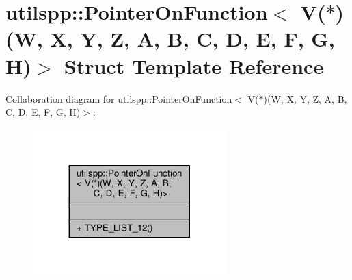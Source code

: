 \hypertarget{structutilspp_1_1PointerOnFunction_3_01V_07_5_08_07W_00_01X_00_01Y_00_01Z_00_01A_00_01B_00_01C_0aa55322b0a01a25603f55328f88cca8b}{\section{utilspp\-:\-:Pointer\-On\-Function$<$ V($\ast$)(W, X, Y, Z, A, B, C, D, E, F, G, H)$>$ Struct Template Reference}
\label{structutilspp_1_1PointerOnFunction_3_01V_07_5_08_07W_00_01X_00_01Y_00_01Z_00_01A_00_01B_00_01C_0aa55322b0a01a25603f55328f88cca8b}
}


Collaboration diagram for utilspp\-:\-:Pointer\-On\-Function$<$ V($\ast$)(W, X, Y, Z, A, B, C, D, E, F, G, H)$>$\-:
\nopagebreak
\begin{figure}[H]
\begin{center}
\leavevmode
\includegraphics[width=212pt]{structutilspp_1_1PointerOnFunction_3_01V_07_5_08_07W_00_01X_00_01Y_00_01Z_00_01A_00_01B_00_01C_065f3d2651e921f121cae102c6b1bb59f}
\end{center}
\end{figure}
